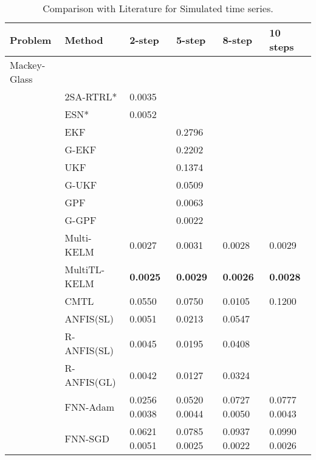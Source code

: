 \documentclass[final,5p,times,twocolumn]{elsarticle}
\begin{document}
 
\begin{table*}[htbp!]

\centering
 \small
 \caption{Comparison with Literature for Simulated time series. }
  
\label{tab:Simulated}
\begin{tabular}{llllll}

\hline
Problem & Method & 2-step & 5-step & 8-step & 10 steps\\
 \hline
 \hline
Mackey-Glass & &  	   &	& &\\
 


 &2SA-RTRL* \cite{chang2012reinforced}&  0.0035  	  &	 & & \\



 &ESN*\cite{chang2012reinforced}&    0.0052	&   	&   &\\
 &EKF\cite{Wu2013AMC}&     	&   0.2796	 &   &\\
 &G-EKF \cite{Wu2013AMC}&     	&   0.2202	 &   &\\
  &UKF \cite{Wu2013AMC}&     	&   	 0.1374&   &\\
  &G-UKF \cite{Wu2013AMC}&     	&   	0.0509&  & \\
 &GPF\cite{Wu2013AMC} &     	&   	0.0063&   &\\

 &G-GPF\cite{Wu2013AMC} &     	&   0.0022	&   &\\

&Multi-KELM\cite{YE2019227} &		0.0027&0.0031&0.0028&0.0029\\
&MultiTL-KELM\cite{YE2019227} &	\textbf{0.0025}&	\textbf{0.0029}&\textbf{0.0026}&\textbf{0.0028}\\
&CMTL \cite{chandra2017CMTLMulti}&  0.0550 & 	0.0750 & 0.0105 & 0.1200	\\





&ANFIS(SL) \cite{ZHOU2019343} &0.0051 &0.0213 & 0.0547 & \\
&R-ANFIS(SL) \cite{ZHOU2019343}&0.0045 &0.0195  &	0.0408 & \\
&R-ANFIS(GL) \cite{ZHOU2019343}&0.0042 & 	0.0127 & 0.0324 & \\

&FNN-Adam &   0.0256	0.0038   	&   0.0520	0.0044     &0.0727	0.0050	       &0.0777	0.0043\\

&FNN-SGD  &     0.0621	0.0051 	&  0.0785	0.0025       &0.0937	0.0022	      &0.0990	0.0026\\


\end{tabular}
\end{table*}
\end{document}
